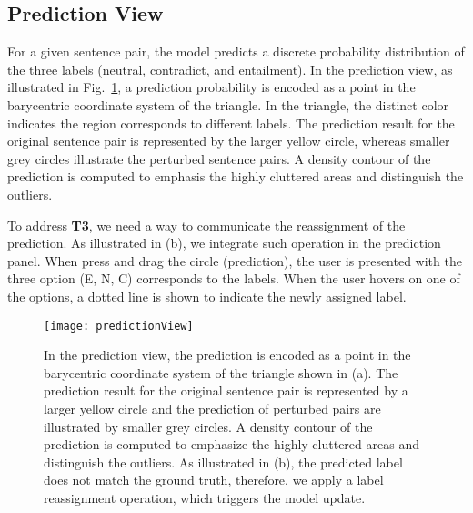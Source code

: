 \subsection{Prediction View}
\label{sec:prediction}
For a given sentence pair, the model predicts a discrete probability distribution of the three labels (neutral, contradict, and entailment).
%
In the prediction view, as illustrated in Fig.~\ref{fig:predictionView}, a prediction probability is encoded as a point in the barycentric coordinate system of the triangle. In the triangle, the distinct color indicates the region corresponds to different labels. The prediction result for the original sentence pair is represented by the larger yellow circle, whereas smaller grey circles illustrate the perturbed sentence pairs. A density contour of the prediction is computed to emphasis the highly cluttered areas and distinguish the outliers.

To address \textbf{T3}, we need a way to communicate the reassignment of the prediction. As illustrated in (b), we integrate such operation in the prediction panel. When press and drag the circle (prediction), the user is presented with the three option (E, N, C) corresponds to the labels. When the user hovers on one of the options, a dotted line is shown to indicate the newly assigned label.

\begin{figure}[htbp]
\centering
\vspace{-2mm}
 \texttt{[image: predictionView]}
 \vspace{-2mm}
 \caption{
In the prediction view, the prediction is encoded as a point in the barycentric coordinate system of the triangle shown in (a).
%
The prediction result for the original sentence pair is represented by a larger yellow circle and the prediction of perturbed pairs are illustrated by smaller grey circles.
A density contour of the prediction is computed to emphasize the highly cluttered areas and distinguish the outliers.
As illustrated in (b), the predicted label does not match the ground truth, therefore, we apply a label reassignment operation, which triggers the model update.
 }
\label{fig:predictionView}
\end{figure}
